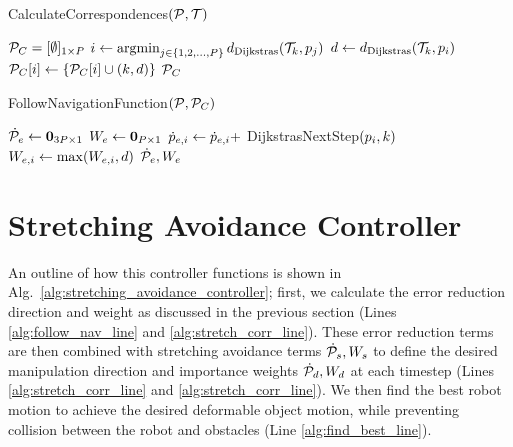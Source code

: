 \begin{algorithm}[t]
\caption{CalculateCorrespondences$(\mathcal{P}, \mathcal{T})$}
\begin{algorithmic}[1]
    \State $\mathcal{P}_C = [ \emptyset ]_{1 \times P}$
        \State $i \gets \operatorname*{argmin}_{j \in \{ 1, 2, \dots, P \}} d_\textrm{Dijkstras}(\mathcal{T}_k, p_j)$
        \State $d \gets d_\textrm{Dijkstras}(\mathcal{T}_k, p_i)$
        \State $\mathcal{P}_C[i] \gets \{ \mathcal{P}_C[i] \cup (k, d)\}$
    \EndFor
    \State \Return $\mathcal{P}_C$
\end{algorithmic}
\label{alg:calculate_correspondences}
\end{algorithm}

\begin{algorithm}[t]
\caption{FollowNavigationFunction$(\mathcal{P}, \mathcal{P}_C)$}
\begin{algorithmic}[1]
    \State $\dot{\mathcal{P}}_e \gets \mathbf{0}_{{3P} \times 1}$
    \State $W_e \gets \mathbf{0}_{P \times 1}$
            \State $\dot{p}_{e,i} \gets \dot{p}_{e,i} +$ DijkstrasNextStep$(p_i, k)$ \label{alg:follow_nav:accumulate}
            \State $W_{e,i} \gets \max(W_{e,i}, d)$ \label{alg:follow_nav:max}
        \EndFor
    \EndFor
    \State \Return $\dot{\mathcal{P}}_e, W_e$
\end{algorithmic}
\label{alg:follow_nav_function}
\end{algorithm}


\section{Stretching Avoidance Controller}
\label{sec:stretching_avoidance_controller}

An outline of how this controller functions is shown in Alg.~\ref{alg:stretching_avoidance_controller}; first, we calculate the error reduction direction and weight as discussed in the previous section (Lines \ref{alg:follow_nav_line} and \ref{alg:stretch_corr_line}). These error reduction terms are then combined with stretching avoidance terms $\dot{\mathcal{P}}_s, W_s$ to define the desired manipulation direction and importance weights $\dot{\mathcal{P}}_d, W_d$ at each timestep (Lines \ref{alg:stretch_corr_line} and \ref{alg:stretch_corr_line}). We then find the best robot motion to achieve the desired deformable object motion, while preventing collision between the robot and obstacles (Line \ref{alg:find_best_line}).

